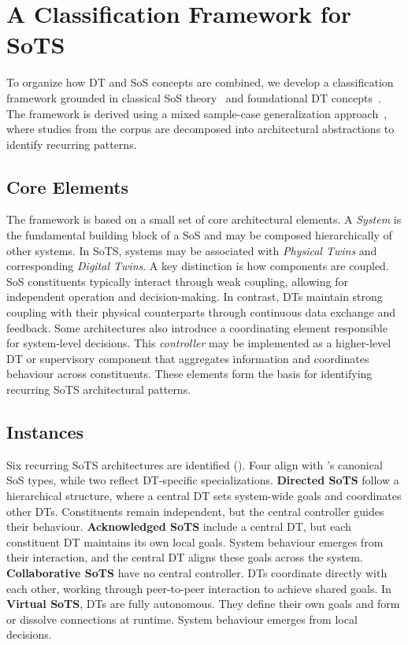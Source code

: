\section{A Classification Framework for SoTS}\label{sec:literature-review-classification}

To organize how DT and SoS concepts are combined, we develop a classification framework grounded in classical SoS theory~\cite{maier1998architecting, maier2014role} and foundational DT concepts~\cite{kritzinger2018digital}. The framework is derived using a mixed sample-case generalization approach~\cite{jwieringa2015six}, where studies from the corpus are decomposed into architectural abstractions to identify recurring patterns.

\subsection{Core Elements}
The framework is based on a small set of core architectural elements. A \textit{System} is the fundamental building block of a SoS and may be composed hierarchically of other systems. In SoTS, systems may be associated with \textit{Physical Twins} and corresponding \textit{Digital Twins}. A key distinction is how components are coupled. SoS constituents typically interact through weak coupling, allowing for independent operation and decision-making. In contrast, DTs maintain strong coupling with their physical counterparts through continuous data exchange and feedback. Some architectures also introduce a coordinating element responsible for system-level decisions. This \textit{controller} may be implemented as a higher-level DT or supervisory component that aggregates information and coordinates behaviour across constituents. These elements form the basis for identifying recurring SoTS architectural patterns.

\subsection{Instances}

Six recurring SoTS architectures are identified (). Four align with \citet{maier1998architecting}'s canonical SoS types, while two reflect DT-specific specializations. \textbf{Directed SoTS} follow a hierarchical structure, where a central DT sets system-wide goals and coordinates other DTs. Constituents remain independent, but the central controller guides their behaviour. \textbf{Acknowledged SoTS} include a central DT, but each constituent DT maintains its own local goals. System behaviour emerges from their interaction, and the central DT aligns these goals across the system. \textbf{Collaborative SoTS} have no central controller. DTs coordinate directly with each other, working through peer-to-peer interaction to achieve shared goals. In \textbf{Virtual SoTS}, DTs are fully autonomous. They define their own goals and form or dissolve connections at runtime. System behaviour emerges from local decisions.

